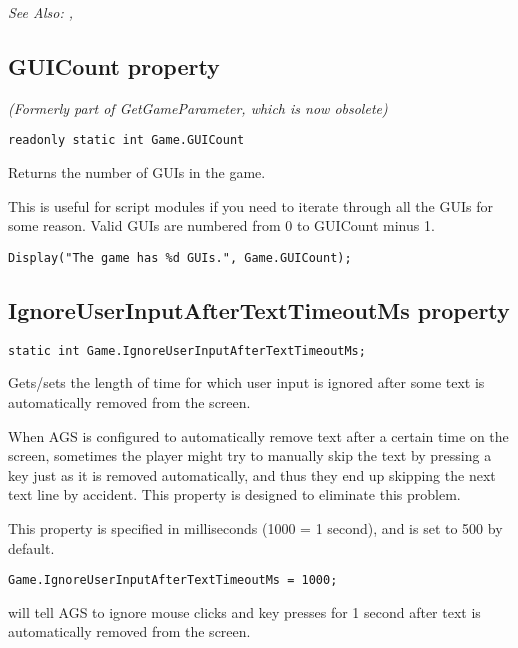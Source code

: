 \it{See Also:} , 


\subsection{GUICount property}\label{Game.GUICount}%

\it{(Formerly part of GetGameParameter, which is now obsolete)}

\begin{verbatim}
readonly static int Game.GUICount
\end{verbatim}
Returns the number of GUIs in the game.

This is useful for script modules if you need to iterate through all the GUIs for some reason.
Valid GUIs are numbered from 0 to GUICount minus 1.

\begin{verbatim}
Display("The game has %d GUIs.", Game.GUICount);
\end{verbatim}


\subsection{IgnoreUserInputAfterTextTimeoutMs property}\label{Game.IgnoreUserInputAfterTextTimeoutMs}%

\begin{verbatim}
static int Game.IgnoreUserInputAfterTextTimeoutMs;
\end{verbatim}
Gets/sets the length of time for which user input is ignored after some text is automatically
removed from the screen.

When AGS is configured to automatically remove text after a certain time on the screen,
sometimes the player might try to manually skip the text by pressing a key just as it
is removed automatically, and thus they end up skipping the next text line by accident.
This property is designed to eliminate this problem.

This property is specified in milliseconds (1000 = 1 second), and is set to 500 by default.

\begin{verbatim}
Game.IgnoreUserInputAfterTextTimeoutMs = 1000;
\end{verbatim}
will tell AGS to ignore mouse clicks and key presses for 1 second after text is automatically
removed from the screen.

